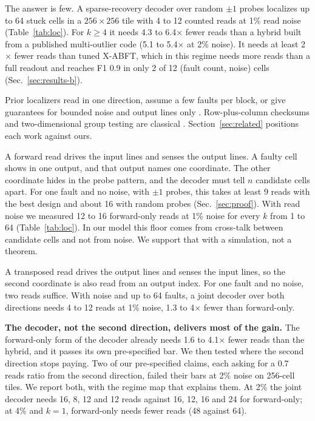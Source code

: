 \documentclass[journal]{IEEEtran}
\begin{document}
The answer is few. A sparse-recovery decoder over random $\pm1$ probes localizes up to 64 stuck cells in a $256\times256$ tile with 4 to 12 counted reads at 1\% read noise (Table~\ref{tab:loc}). For $k\ge4$ it needs 4.3 to 6.4$\times$ fewer reads than a hybrid built from a published multi-outlier code (5.1 to 5.4$\times$ at 2\% noise). It needs at least 2$\times$ fewer reads than tuned X-ABFT, which in this regime needs more reads than a full readout and reaches F1 0.9 in only 2 of 12 (fault count, noise) cells (Sec.~\ref{sec:results-b}).

Prior localizers read in one direction, assume a few faults per block, or give guarantees for bounded noise and output lines only \cite{liu2020xabft,weiroth2024,hpe11804859,neuralchecksums2024}. Row-plus-column checksums and two-dimensional group testing are classical \cite{huang1984abft}. Section~\ref{sec:related} positions each work against ours.

A forward read drives the input lines and senses the output lines. A faulty cell shows in one output, and that output names one coordinate. The other coordinate hides in the probe pattern, and the decoder must tell $n$ candidate cells apart. For one fault and no noise, with $\pm1$ probes, this takes at least 9 reads with the best design and about 16 with random probes (Sec.~\ref{sec:proof}). With read noise we measured 12 to 16 forward-only reads at 1\% noise for every $k$ from 1 to 64 (Table~\ref{tab:loc}). In our model this floor comes from cross-talk between candidate cells and not from noise. We support that with a simulation, not a theorem.

A transposed read drives the output lines and senses the input lines, so the second coordinate is also read from an output index. For one fault and no noise, two reads suffice. With noise and up to 64 faults, a joint decoder over both directions needs 4 to 12 reads at 1\% noise, 1.3 to 4$\times$ fewer than forward-only.

\textbf{The decoder, not the second direction, delivers most of the gain.} The forward-only form of the decoder already needs 1.6 to 4.1$\times$ fewer reads than the hybrid, and it passes its own pre-specified bar. We then tested where the second direction stops paying. Two of our pre-specified claims, each asking for a 0.7 reads ratio from the second direction, failed their bars at 2\% noise on 256-cell tiles. We report both, with the regime map that explains them. At 2\% the joint decoder needs 16, 8, 12 and 12 reads against 16, 12, 16 and 24 for forward-only; at 4\% and $k=1$, forward-only needs fewer reads (48 against 64).
\end{document}
